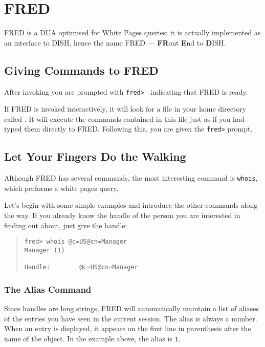 
\chapter{FRED}
\label{DUA:fred}
FRED is a DUA optimised for White Pages queries; it is actually
implemented as an interface to DISH, hence the name FRED --- {\bf FR}ont 
{\bf E}nd to {\bf D}ISH.

\section	{Giving Commands to FRED}\label{fred:commands}
After invoking 
you are prompted with \verb"fred> " indicating that FRED is ready.

If FRED is invoked interactively,
it will look for a file in your home directory called .
It will execute the commands contained in this file just as if you had typed
them directly to FRED.
Following this,
you are given the \verb"fred>" prompt.

\section	{Let Your Fingers Do the Walking}
Although FRED has several commands,
the most interesting command is \verb"whois",
which performs a white pages query.

Let's begin with some simple examples and introduce the other commands along
the way.
If you already know the handle of the person you are interested in finding out
about,
just give the handle:
\begin{quote}\smaller\begin{verbatim}
fred> whois @c=US@cn=Manager
Manager (1)

Handle:        @c=US@cn=Manager
\end{verbatim}\end{quote}

\subsection	{The Alias Command}
Since handles are long strings,
FRED will automatically maintain a list of aliases of the entries you
have seen in the current session.
The alias is always a number.
When an entry is displayed,
it appears on the first line in parenthesis after the name of the object.
In the example above,
the alias is \verb"1".

